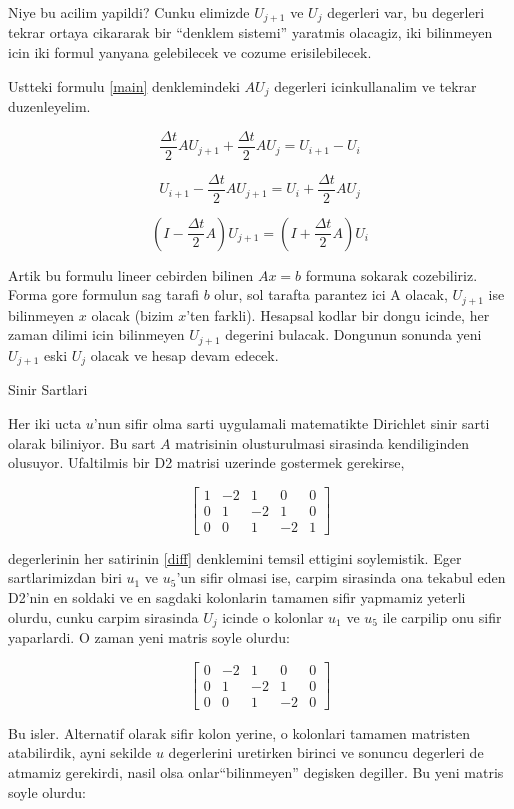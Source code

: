 \documentclass[12pt,fleqn]{article}\usepackage{../common}
\begin{document}
Niye bu acilim yapildi? Cunku elimizde $U_{j+1}$ ve $U_j$ degerleri var, bu
degerleri tekrar ortaya cikararak bir ``denklem sistemi'' yaratmis olacagiz, iki
bilinmeyen icin iki formul yanyana gelebilecek ve cozume erisilebilecek. 

Ustteki formulu \ref{main} denklemindeki $AU_j$ degerleri
icinkullanalim ve tekrar duzenleyelim.

\[ \frac{\Delta t}{2}AU_{j+1} + \frac{\Delta t}{2}AU_j = U_{i+1} - U_i  \]

\[ U_{i+1} - \frac{\Delta t}{2}AU_{j+1} = U_i + \frac{\Delta t}{2}AU_j  \]

\[ (I - \frac{\Delta t}{2}A) U_{j+1} = (I + \frac{\Delta t}{2}A)U_i \]

Artik bu formulu lineer cebirden bilinen $Ax=b$ formuna sokarak
cozebiliriz. Forma gore formulun sag tarafi $b$ olur, sol tarafta parantez ici A
olacak, $U_{j+1}$ ise bilinmeyen $x$ olacak (bizim $x$'ten farkli). Hesapsal
kodlar bir dongu icinde, her zaman dilimi icin bilinmeyen $U_{j+1}$ degerini
bulacak. Dongunun sonunda yeni $U_{j+1}$ eski $U_j$ olacak ve hesap devam
edecek. 

Sinir Sartlari

Her iki ucta $u$'nun sifir olma sarti uygulamali matematikte Dirichlet sinir
sarti olarak biliniyor. Bu sart $A$ matrisinin olusturulmasi sirasinda
kendiliginden olusuyor. Ufaltilmis bir D2 matrisi uzerinde gostermek gerekirse, 

\[ \left[ \begin{array}{ccccc}
1 & -2 & 1 & 0 & 0 \\
0 & 1 & -2 & 1 & 0 \\
0 & 0 & 1 & -2 & 1
\end{array} \right]
 \]

degerlerinin her satirinin \ref{diff} denklemini temsil ettigini
soylemistik. Eger sartlarimizdan biri $u_1$ ve $u_5$'un sifir olmasi ise, carpim
sirasinda ona tekabul eden D2'nin en soldaki ve en sagdaki kolonlarin tamamen
sifir yapmamiz yeterli olurdu, cunku carpim sirasinda $U_j$ icinde o kolonlar
$u_1$ ve $u_5$ ile carpilip onu sifir yaparlardi. O zaman yeni matris soyle
olurdu:

\[ 
\left[ \begin{array}{ccccc}
0 & -2 & 1 & 0 & 0 \\
0 & 1 & -2 & 1 & 0 \\
0 & 0 & 1 & -2 & 0
\end{array} \right]
 \]

Bu isler. Alternatif olarak sifir kolon yerine, o kolonlari tamamen matristen
atabilirdik, ayni sekilde $u$ degerlerini uretirken birinci ve sonuncu degerleri
de atmamiz gerekirdi, nasil olsa onlar``bilinmeyen'' degisken degiller. Bu yeni
matris soyle olurdu:
\end{document}

